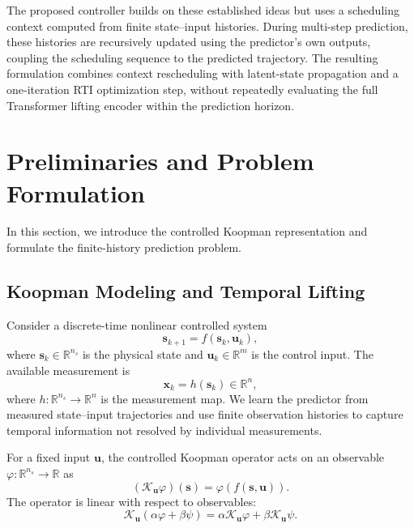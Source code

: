 \documentclass[journal]{IEEEtran}
\newcommand{\vx}{\mathbf{x}}
\newcommand{\vu}{\mathbf{u}}
\newcommand{\vs}{\mathbf{s}}
\begin{document}
The proposed controller builds on these established ideas but uses a scheduling context computed from finite state--input histories. During multi-step prediction, these histories are recursively updated using the predictor's own outputs, coupling the scheduling sequence to the predicted trajectory. The resulting formulation combines context rescheduling with latent-state propagation and a one-iteration RTI optimization step, without repeatedly evaluating the full Transformer lifting encoder within the prediction horizon.

\section{Preliminaries and Problem Formulation}
\label{sec:preliminaries_and_problem}

In this section, we introduce the controlled Koopman representation and formulate the finite-history prediction problem.

\subsection{Koopman Modeling and Temporal Lifting}
\label{subsec:koopman_prelim}

Consider a discrete-time nonlinear controlled system
\begin{equation}
    \vs_{k+1} = f(\vs_k, \vu_k),
    \label{eq:nonlinear_system}
\end{equation}
where $\vs_k \in \mathbb{R}^{n_s}$ is the physical state and $\vu_k \in \mathbb{R}^{m}$ is the control input. The available measurement is
\begin{equation}
    \vx_k = h(\vs_k) \in \mathbb{R}^{n},
    \label{eq:measurement_map}
\end{equation}
where $h:\mathbb{R}^{n_s}\to\mathbb{R}^{n}$ is the measurement map. We learn the predictor from measured state--input trajectories and use finite observation histories to capture temporal information not resolved by individual measurements.

For a fixed input $\vu$, the controlled Koopman operator acts on an observable $\varphi:\mathbb{R}^{n_s}\to\mathbb{R}$ as \cite{koopman1931hamiltonian, mezic2005spectral, rowley2009spectral, brunton2022modern}
\begin{equation}
    (\mathcal{K}_{\vu}\varphi)(\vs) = \varphi(f(\vs,\vu)).
    \label{eq:koopman_operator}
\end{equation}
The operator is linear with respect to observables:
\begin{equation}
    \mathcal{K}_{\vu}(\alpha \varphi + \beta \psi)
    = \alpha \mathcal{K}_{\vu}\varphi + \beta \mathcal{K}_{\vu}\psi.
    \label{eq:koopman_linearity}
\end{equation}
\end{document}
